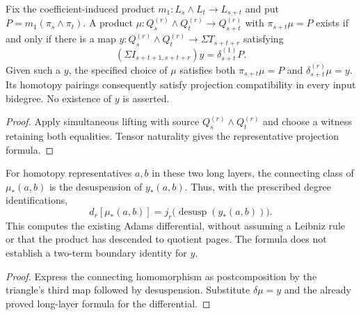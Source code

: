 \begin{proposition}
  \label{prop:h6-product-from-boundary-lift}
  \leanok
  Fix the coefficient-induced product $m_1:L_s\wedge L_t\to L_{s+t}$
  and put $P=m_1(\pi_s\wedge\pi_t)$. A product
  $\mu:Q_s^{(r)}\wedge Q_t^{(r)}\to Q_{s+t}^{(r)}$ with
  $\pi_{s+t}\mu=P$ exists if and only if there is a map
  $y:Q_s^{(r)}\wedge Q_t^{(r)}\to\Sigma T_{s+t+r}$ satisfying
  \[
    (\Sigma I_{s+t+1,s+t+r})y=\delta_{s+t}^{(1)}P.
  \]
  Given such a $y$, the specified choice of $\mu$ satisfies both
  $\pi_{s+t}\mu=P$ and $\delta_{s+t}^{(r)}\mu=y$.
  Its homotopy pairings consequently satisfy projection compatibility
  in every input bidegree. No existence of $y$ is asserted.
\end{proposition}
\begin{proof}
  Apply simultaneous lifting with source $Q_s^{(r)}\wedge Q_t^{(r)}$
  and choose a witness retaining both equalities. Tensor naturality
  gives the representative projection formula.
  \leanok
\end{proof}

\begin{proposition}
  \label{prop:h6-product-lift-differential}
  \leanok
  For homotopy representatives $a,b$ in these two long layers, the
  connecting class of $\mu_*(a,b)$ is the desuspension of $y_*(a,b)$.
  Thus, with the prescribed degree identifications,
  \[
    d_r[\mu_*(a,b)]=j_r\bigl(\operatorname{desusp}(y_*(a,b))\bigr).
  \]
  This computes the existing Adams differential, without assuming a
  Leibniz rule or that the product has descended to quotient pages.
  The formula does not establish a two-term boundary identity for $y$.
\end{proposition}
\begin{proof}
  Express the connecting homomorphism as postcomposition by the triangle's
  third map followed by desuspension. Substitute $\delta\mu=y$ and the
  already proved long-layer formula for the differential.
  \leanok
\end{proof}


